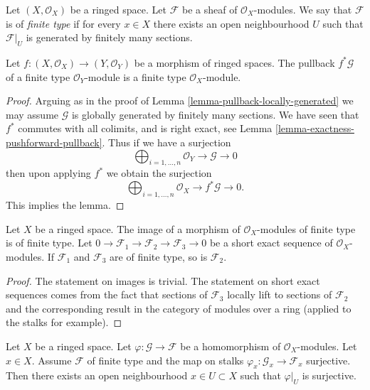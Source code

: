 \begin{definition}
\label{definition-finite-type}
Let $(X, \mathcal{O}_X)$ be a ringed space.
Let $\mathcal{F}$ be a sheaf of $\mathcal{O}_X$-modules.
We say that $\mathcal{F}$ is of {\it finite type}
if for every $x \in X$ there exists an open
neighbourhood $U$ such that $\mathcal{F}|_U$
is generated by finitely many sections.
\end{definition}

\begin{lemma}
\label{lemma-pullback-finite-type}
Let $f : (X, \mathcal{O}_X) \to (Y, \mathcal{O}_Y)$
be a morphism of ringed spaces.
The pullback $f^*\mathcal{G}$ of a finite type
$\mathcal{O}_Y$-module is a finite type $\mathcal{O}_X$-module.
\end{lemma}

\begin{proof}
Arguing as in the proof of Lemma \ref{lemma-pullback-locally-generated}
we may assume $\mathcal{G}$ is globally generated by finitely
many sections.
We have seen that $f^*$ commutes with all colimits,
and is right exact, see Lemma \ref{lemma-exactness-pushforward-pullback}.
Thus if we have a surjection
$$
\bigoplus\nolimits_{i = 1, \ldots, n}
\mathcal{O}_Y
\to
\mathcal{G}
\to
0
$$
then upon applying $f^*$ we obtain the surjection
$$
\bigoplus\nolimits_{i = 1, \ldots, n}
\mathcal{O}_X
\to
f^*\mathcal{G}
\to
0.
$$
This implies the lemma.
\end{proof}

\begin{lemma}
\label{lemma-extension-finite-type}
Let $X$ be a ringed space.
The image of a morphism of $\mathcal{O}_X$-modules of finite
type is of finite type.
Let
$0 \to \mathcal{F}_1 \to \mathcal{F}_2 \to \mathcal{F}_3 \to 0$
be a short exact sequence of $\mathcal{O}_X$-modules.
If $\mathcal{F}_1$ and $\mathcal{F}_3$ are of finite type,
so is $\mathcal{F}_2$.
\end{lemma}

\begin{proof}
The statement on images is trivial.
The statement on short exact sequences comes from the
fact that sections of $\mathcal{F}_3$ locally lift to sections
of $\mathcal{F}_2$ and the corresponding result in
the category of modules over a ring (applied to the stalks
for example).
\end{proof}

\begin{lemma}
\label{lemma-finite-type-surjective-on-stalk}
Let $X$ be a ringed space.
Let $\varphi : \mathcal{G} \to \mathcal{F}$ be a homomorphism
of $\mathcal{O}_X$-modules.
Let $x \in X$. Assume $\mathcal{F}$ of finite type and
the map on stalks
$\varphi_x : \mathcal{G}_x \to \mathcal{F}_x$ surjective.
Then there exists an open neighbourhood
$x \in U \subset X$ such that $\varphi|_U$ is surjective.
\end{lemma}

